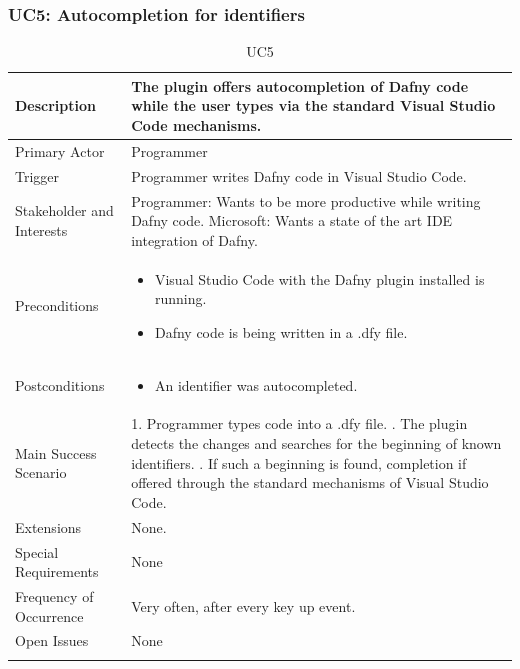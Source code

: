 \subsubsection{UC5: Autocompletion for identifiers}
\begin{longtable}{l | p{} }
	Description & The plugin offers autocompletion of Dafny code while the user types via the standard Visual Studio Code mechanisms.\\ \hline
	Primary Actor & Programmer\\ \hline
	Trigger & Programmer writes Dafny code in Visual Studio Code.\\ \hline
	Stakeholder and Interests & Programmer: Wants to be more productive while writing Dafny code. \newline Microsoft: Wants a state of the art IDE integration of Dafny.\\ \hline
	Preconditions &
	\begin{itemize}
		\item Visual Studio Code with the Dafny plugin installed is running.
		\item Dafny code is being written in a .dfy file.
	\end{itemize}\\ \hline
	Postconditions &
	\begin{itemize}
		\item An identifier was autocompleted.
	\end{itemize}\\ \hline
	Main Success Scenario & 
	1. Programmer types code into a .dfy file. \newline
	2. The plugin detects the changes and searches for the beginning of known identifiers. \newline
	3. If such a beginning is found, completion if offered through the standard mechanisms of Visual Studio Code.\\ \hline
	Extensions & 
	None. \\ \hline
	Special Requirements & None\\ \hline
	Frequency of Occurrence & Very often, after every key up event.\\ \hline
	Open Issues & None \\ \hline
	\caption{UC5}
\end{longtable}